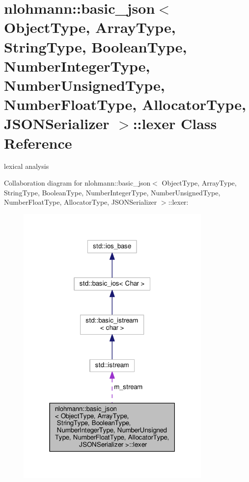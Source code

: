 \hypertarget{classnlohmann_1_1basic__json_1_1lexer}{}\section{nlohmann\+:\+:basic\+\_\+json$<$ Object\+Type, Array\+Type, String\+Type, Boolean\+Type, Number\+Integer\+Type, Number\+Unsigned\+Type, Number\+Float\+Type, Allocator\+Type, J\+S\+O\+N\+Serializer $>$\+:\+:lexer Class Reference}
\label{classnlohmann_1_1basic__json_1_1lexer}


lexical analysis  




Collaboration diagram for nlohmann\+:\+:basic\+\_\+json$<$ Object\+Type, Array\+Type, String\+Type, Boolean\+Type, Number\+Integer\+Type, Number\+Unsigned\+Type, Number\+Float\+Type, Allocator\+Type, J\+S\+O\+N\+Serializer $>$\+:\+:lexer\+:\nopagebreak
\begin{figure}[H]
\begin{center}
\leavevmode
\includegraphics[width=271pt]{classnlohmann_1_1basic__json_1_1lexer__coll__graph}
\end{center}
\end{figure}
